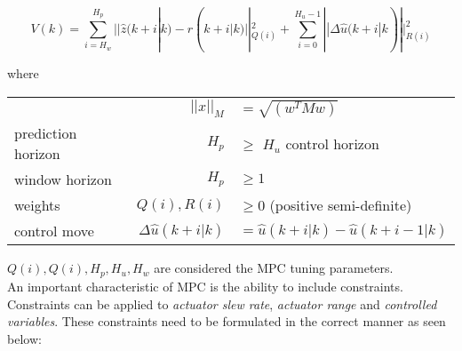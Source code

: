 \begin{equation} \label{eq:mpc_cost_fcn}
	V(k) = \sum_{i=H_w}^{H_p}||\hat{z}(k+i|k) - r(k+i|k)||^2_{Q(i)} + \sum_{i=0}^{H_u-1}||\Delta \hat{u}(k+i|k)||^2_{R(i)}
\end{equation}

where

\begin{center}
	\begin{tabular}{l r l }
		                   & $||x||_M$               & $= \sqrt{\left(w^TMw\right)}$         \\
		prediction horizon & $H_p$                   & $\ge$ $H_u$ control horizon           \\
		window horizon     & $H_p$                   & $\ge 1$                               \\
		weights            & $Q(i), R(i)$            & $\ge 0$ (positive semi-definite)      \\
		control move       & $\Delta \hat{u}(k+i|k)$ & $= \hat{u}(k+i|k) - \hat{u}(k+i-1|k)$
	\end{tabular}
\end{center}

$Q(i), Q(i), H_p, H_u, H_w$ are considered the MPC tuning parameters.\\

An important characteristic of MPC is the ability to include constraints. Constraints can be applied to \textit{actuator slew rate}, \textit{actuator range} and \textit{controlled variables}. These constraints need to be formulated in the correct manner as seen below:

